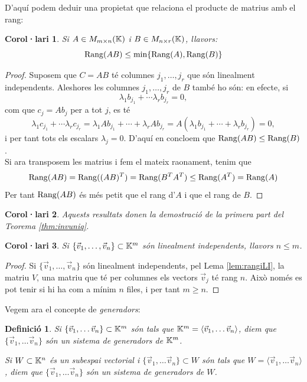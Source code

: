 \documentclass[
  11pt,
]{book}
\numberwithin{dummy}{section}
\theoremstyle{maincolornumbox}
\theoremstyle{blacknumex}
\theoremstyle{blacknumbox}
\newtheorem{definitionT}{Definició}[chapter]
\newtheorem{corollaryT}{Corol·lari}[chapter]
\theoremstyle{maincolornum}
\newenvironment{corollary}{\begin{cBox}\begin{corollaryT}}{\end{corollaryT}\end{cBox}}
\newenvironment{definition}{\begin{dBox}\begin{definitionT}}{\end{definitionT}\end{dBox}}
\newlength\esp
\begin{document}
D'aquí podem deduir una propietat que relaciona el producte de matrius
amb el rang:

\begin{corollary}
Si \(A\in M_{m\times n}(\mathbb{K})\) i \(B\in M_{n\times r}(\mathbb{K})\), llavors:
\[\operatorname{Rang}(AB)\leq \min\{\operatorname{Rang}(A),\operatorname{Rang}(B)\}\]
\end{corollary}

\begin{proof}
Suposem que \(C=AB\) té columnes \(j_1,\ldots,j_r\) que són
linealment independents. Aleshores les columnes \(j_1,\ldots,j_r\) de \(B\)
també ho són: en efecte, si
\[\lambda_1b_{j_1}+\cdots\lambda_rb_{j_r} = 0,\] com que \(c_j=Ab_j\) per
a tot \(j\), es té
\[\lambda_1 c_{j_1} +\cdots \lambda_r c_{j_r}=\lambda_1 A b_{j_1} + \cdots + \lambda_r A b_{j_r} = A(\lambda_1b_{j_1}+\cdots+\lambda_r b_{j_r})=0,\]
i per tant tots els escalars \(\lambda_j=0\). D'aquí en concloem que
\(\operatorname{Rang}(AB)\leq \operatorname{Rang}(B)\).\\
Si ara transposem les matrius i fem el mateix raonament, tenim que
\[\operatorname{Rang}(AB)=\operatorname{Rang}((AB)^T)=\operatorname{Rang}(B^TA^T)\leq \operatorname{Rang}(A^T)=\operatorname{Rang}(A)\] Per
tant \(\operatorname{Rang}(AB)\) és més petit que el rang d'\(A\) i que el rang de \(B\).
\end{proof}

\begin{corollary}
\protect\hypertarget{cor:invuniq}{}\label{cor:invuniq}Aquests resultats donen la
demostració de la primera part del Teorema
\ref{thm:invuniq}.
\end{corollary}

\begin{corollary}
\protect\hypertarget{cor:maximLI}{}\label{cor:maximLI}Si
\(\{\vec v_1, \dots, \vec v_n\}\subset \mathbb{K}^m\) són linealment independents,
llavors \(n\leq m\).
\end{corollary}

\begin{proof}
Si \(\{\vec v_1, \dots, \vec v_n\}\) són linealment independents,
pel Lema \ref{lem:rangiLI}, la matriu \(V\), una matriu que té per columnes
els vectors \(\vec v_j\) té rang \(n\). Això només es pot tenir si hi ha com
a mínim \(n\) files, i per tant \(m\geq n\).
\end{proof}

Vegem ara el concepte de \emph{generadors}:

\begin{definition}
\protect\hypertarget{def:sistgen}{}\label{def:sistgen}Si
\(\{\vec v_1, \dots \vec v_n\}\subset \mathbb{K}^m\) són tals que
\(\mathbb{K}^m=\langle \vec v_1, \dots \vec v_n\rangle\), diem que
\emph{\(\{\vec v_1, \dots \vec v_n\}\) són un sistema de generadors de \(\mathbb{K}^m\)}.

Si \(W\subset \mathbb{K}^n\) és un subespai vectorial i
\(\{\vec v_1, \dots \vec v_n\}\subset W\) són tals que
\(W=\langle \vec v_1, \dots \vec v_n\rangle\), diem que
\emph{\(\{\vec v_1, \dots \vec v_n\}\) són un sistema de generadors de \(W\)}.
\end{definition}
\end{document}
